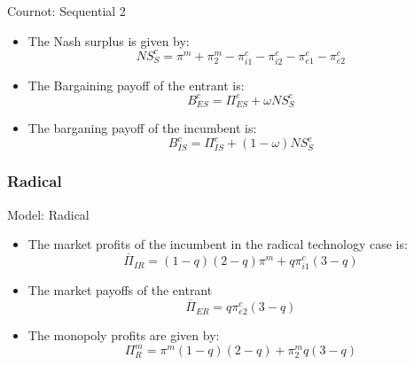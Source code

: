 \documentclass{beamer}
\begin{document}
\begin{frame}{Cournot: Sequential 2}
\begin{itemize}
\item The Nash surplus is given by:
\begin{equation*}
NS_{S}^{c} = \pi^m+\pi^m_{2}- \pi_{i1}^{c}-\pi_{i2}^{c}-\pi_{e1}^{c}-\pi_{e2}^{c}
\end{equation*}

\item The Bargaining payoff of the entrant is: 
\begin{equation*}
B_{ES}^{c} = \Pi_{ES}^{c} + \omega NS_{S}^{c} 
\end{equation*}
    
\item The barganing payoff of the incumbent is: \begin{equation*}
B_{IS}^{c} = \Pi_{IS}^{c}+ (1-\omega) NS_{S}^{c}
\end{equation*}
\end{itemize}
\end{frame}

\subsubsection{Radical}

\begin{frame}{Model: Radical}
\begin{itemize}
    \item The market profits of the incumbent in the radical  technology case is:
    \begin{equation*}
       \overline{\Pi}_{IR} = (1-q) (2-q)\pi^{m}  + q \pi_{i1}^{c}(3-q)
    \end{equation*}
    \item The market payoffs of the entrant 
    \begin{equation*}
\overline{\Pi}_{ER} =
q \pi_{e2}^{c} (3-q)
    \end{equation*}
    \item The monopoly profits are given by:
\begin{equation*}
\Pi_{R}^{m} = \pi^{m} (1-q) (2-q)+\pi_{2}^{m} q (3-q)
\end{equation*}
\end{itemize}
\end{frame}
\end{document}
